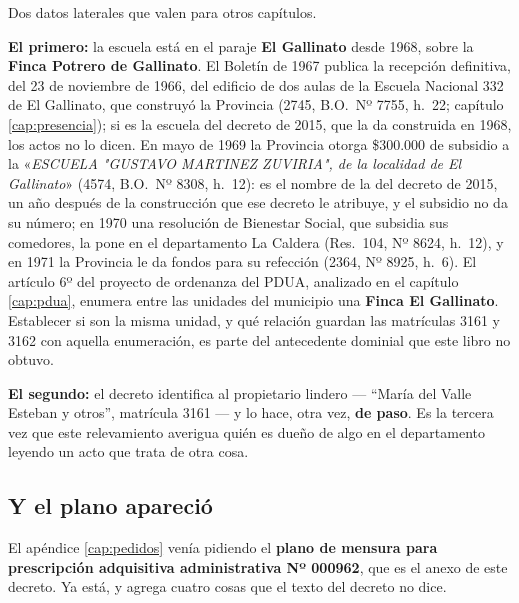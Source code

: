 \begin{cautela}
Dos datos laterales que valen para otros capítulos.

\textbf{El primero:} la escuela está en el paraje \textbf{El Gallinato} desde 1968, sobre la \textbf{Finca Potrero de Gallinato}. El Boletín de 1967 publica la recepción definitiva, del 23 de noviembre de 1966, del edificio de dos aulas de la Escuela Nacional 332 de El Gallinato, que construyó la Provincia (2745, B.O.\ Nº 7755, h.\ 22; capítulo \ref{cap:presencia}); si es la escuela del decreto de 2015, que la da construida en 1968, los actos no lo dicen. En mayo de 1969 la Provincia otorga \$300.000 de subsidio a la «\textit{ESCUELA "GUSTAVO MARTINEZ ZUVIRIA", de la localidad de El Gallinato}» (4574, B.O.\ Nº 8308, h.\ 12): es el nombre de la del decreto de 2015, un año después de la construcción que ese decreto le atribuye, y el subsidio no da su número; en 1970 una resolución de Bienestar Social, que subsidia sus comedores, la pone en el departamento La Caldera (Res.\ 104, Nº 8624, h.\ 12), y en 1971 la Provincia le da fondos para su refección (2364, Nº 8925, h.\ 6). El artículo 6º del proyecto de ordenanza del PDUA, analizado en el capítulo \ref{cap:pdua}, enumera entre las unidades del municipio una \textbf{Finca El Gallinato}. Establecer si son la misma unidad, y qué relación guardan las matrículas 3161 y 3162 con aquella enumeración, es parte del antecedente dominial que este libro no obtuvo.

\textbf{El segundo:} el decreto identifica al propietario lindero --- ``María del Valle Esteban y otros'', matrícula 3161 --- y lo hace, otra vez, \textbf{de paso}. Es la tercera vez que este relevamiento averigua quién es dueño de algo en el departamento leyendo un acto que trata de otra cosa.
\end{cautela}


\subsection*{Y el plano apareció}

El apéndice \ref{cap:pedidos} venía pidiendo el \textbf{plano de mensura para prescripción
adquisitiva administrativa Nº 000962}, que es el anexo de este decreto. Ya está, y agrega
cuatro cosas que el texto del decreto no dice.


